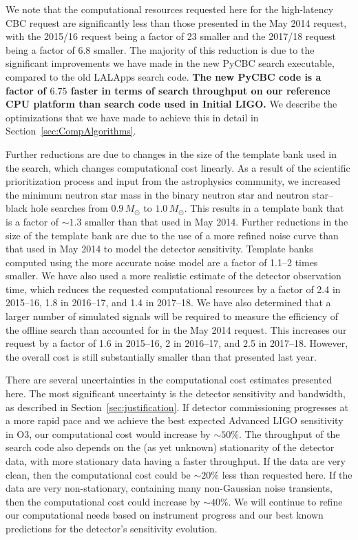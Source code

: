 We note that the computational resources requested here for the
high-latency CBC request are significantly less than those presented in the
May 2014 request, with the 2015/16 request being a factor of 23 smaller and
the 2017/18 request being a factor of 6.8 smaller. The majority of this
reduction is due to the significant improvements we have made in the new PyCBC
search executable, compared to the old LALApps search code. \textbf{The new
PyCBC code is a factor of $\mathbf{6.75}$ faster in terms of search throughput on our
reference CPU platform than search code used in Initial LIGO.} We describe the
optimizations that we have made to achieve this in detail in
Section~\ref{sec:CompAlgorithms}.

Further reductions are due to changes in the size of the template bank used in
the search, which changes computational cost linearly.  As a result of the scientific prioritization process and input
from the astrophysics community, we increased the minimum neutron star mass in
the binary neutron star and neutron star--black hole searches from $0.9\,
M_\odot$ to $1.0\, M_\odot$. This results in a template bank that is a factor of
$\sim 1.3$ smaller than that used in May 2014. Further reductions in the size
of the template bank are due to the use of a more refined noise curve than
that used in May 2014 to model the detector sensitivity.  
Template banks computed using the more accurate noise model are a
factor of 1.1--2 times smaller.
We have also used a more realistic estimate of the detector observation time,
which reduces the requested computational resources by a factor of 2.4 in
2015--16, 1.8 in 2016--17, and 1.4 in 2017--18. We have also determined that a
larger number of simulated signals will be required to measure the efficiency
of the offline search than accounted for in the May 2014 request. This
increases our request by a factor of 1.6 in 2015--16, 2 in 2016--17, and 2.5
in 2017--18. However, the overall cost is still
substantially smaller than that presented last year.

There are several uncertainties in the computational cost
estimates presented here. The most significant uncertainty is the detector
sensitivity and bandwidth, as described in Section~\ref{sec:justification}. If
detector commissioning progresses at a more rapid pace and we achieve the best
expected Advanced LIGO sensitivity in O3, our computational cost would
increase by $\sim 50\%$. The throughput of the search code also depends on the
(as yet unknown) stationarity of the detector data, with more stationary data
having a faster throughput. If the data are very clean, then the
computational cost could be $\sim 20\%$ less than requested here. If the data
are very non-stationary, containing many non-Gaussian noise transients, then
the computational cost could increase by $\sim 40\%$. %
We will continue to
refine our computational needs based on instrument progress and our best known
predictions for the detector's sensitivity evolution.

